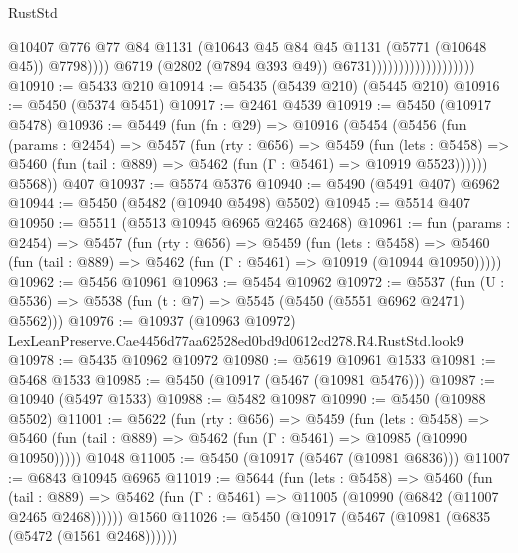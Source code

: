 \begin{lexlean}{RustStd}
\begin{coremodule}
                                                @10407
                                                @776
                                                @77
                                                @84
                                                @1131
                                                (@10643
                                                  @45
                                                  @84
                                                  @45
                                                  @1131
                                                  (@5771 (@10648 @45))
                                                  @7798))))
                                          @6719
                                          (@2802 (@7894 @393 @49))
                                          @6731)))))))))))))))))))
@10910 := @5433 @210
@10914 := @5435 (@5439 @210) (@5445 @210)
@10916 := @5450 (@5374 @5451)
@10917 := @2461 @4539
@10919 := @5450 (@10917 @5478)
@10936 := @5449
    (fun (fn : @29) =>
    @10916
      (@5454
        (@5456
          (fun (params : @2454) =>
          @5457
            (fun (rty : @656) =>
            @5459
              (fun (lets : @5458) =>
              @5460 (fun (tail : @889) => @5462 (fun (Γ : @5461) => @10919 @5523))))))
        @5568))
    @407
@10937 := @5574 @5376
@10940 := @5490 (@5491 @407) @6962
@10944 := @5450 (@5482 (@10940 @5498) @5502)
@10945 := @5514 @407
@10950 := @5511 (@5513 @10945 @6965 @2465 @2468)
@10961 := fun (params : @2454) =>
  @5457
    (fun (rty : @656) =>
    @5459
      (fun (lets : @5458) =>
      @5460 (fun (tail : @889) => @5462 (fun (Γ : @5461) => @10919 (@10944 @10950)))))
@10962 := @5456 @10961
@10963 := @5454 @10962
@10972 := @5537 (fun (U : @5536) => @5538 (fun (t : @7) => @5545 (@5450 (@5551 @6962 @2471) @5562)))
@10976 := @10937 (@10963 @10972) LexLeanPreserve.Cae4456d77aa62528ed0bd9d0612cd278.R4.RustStd.look9
@10978 := @5435 @10962 @10972
@10980 := @5619 @10961 @1533
@10981 := @5468 @1533
@10985 := @5450 (@10917 (@5467 (@10981 @5476)))
@10987 := @10940 (@5497 @1533)
@10988 := @5482 @10987
@10990 := @5450 (@10988 @5502)
@11001 := @5622
    (fun (rty : @656) =>
    @5459
      (fun (lets : @5458) =>
      @5460 (fun (tail : @889) => @5462 (fun (Γ : @5461) => @10985 (@10990 @10950)))))
    @1048
@11005 := @5450 (@10917 (@5467 (@10981 @6836)))
@11007 := @6843 @10945 @6965
@11019 := @5644
    (fun (lets : @5458) =>
    @5460
      (fun (tail : @889) =>
      @5462 (fun (Γ : @5461) => @11005 (@10990 (@6842 (@11007 @2465 @2468))))))
    @1560
@11026 := @5450 (@10917 (@5467 (@10981 (@6835 (@5472 (@1561 @2468))))))

\end{coremodule}
\end{lexlean}
